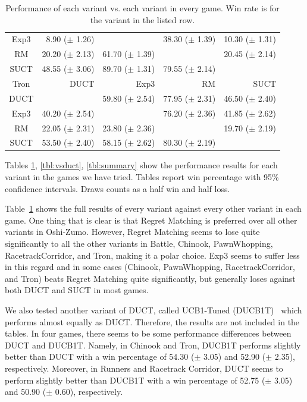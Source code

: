 \documentclass[conference]{IEEEtran}
\begin{document}
\begin{table}
\begin{center}
\begin{tabular}{|c|rrrr|}
           Exp3    & 8.90 ($\pm$ 1.26)   &          & 38.30 ($\pm$ 1.39)   & 10.30 ($\pm$ 1.31)   \\
             RM    & 20.20 ($\pm$ 2.13)   & 61.70 ($\pm$ 1.39)   &          & 20.45 ($\pm$ 2.14)   \\
           SUCT    & 48.55 ($\pm$ 3.06)   & 89.70 ($\pm$ 1.31)   & 79.55 ($\pm$ 2.14)   &          \\
\hline
\hline
           Tron   &       DUCT   &       Exp3   &         RM   &       SUCT   \\
\hline
           DUCT    &          & 59.80 ($\pm$ 2.54)   & 77.95 ($\pm$ 2.31)   & 46.50 ($\pm$ 2.40)   \\
           Exp3    & 40.20 ($\pm$ 2.54)   &          & 76.20 ($\pm$ 2.36)   & 41.85 ($\pm$ 2.62)   \\
             RM    & 22.05 ($\pm$ 2.31)   & 23.80 ($\pm$ 2.36)   &          & 19.70 ($\pm$ 2.19)   \\
           SUCT    & 53.50 ($\pm$ 2.40)   & 58.15 ($\pm$ 2.62)   & 80.30 ($\pm$ 2.19)   &          \\
\hline
\end{tabular}
\end{center}
\caption{Performance of each variant vs. each variant in every game. Win rate is for the variant in the listed row. \label{tbl:cross}}
\end{table}

Tables \ref{tbl:cross}, \ref{tbl:vsduct}, \ref{tbl:summary} show the performance results for each variant in the games we have tried. 
Tables report win percentage with 95\% confidence intervals. Draws counts as a half win and half loss. 

Table~\ref{tbl:cross} shows the full results of every variant against every other variant in each game. One thing that is clear is that 
Regret Matching is preferred over all other variants in Oshi-Zumo. However, Regret Matching seems to lose quite significantly to all the 
other variants in Battle, Chinook, PawnWhopping, RacetrackCorridor, and Tron, making it a polar choice. Exp3 seems to suffer less in this
regard and in some cases (Chinook, PawnWhopping, RacetrackCorridor, and Tron) beats Regret Matching quite significantly, but generally loses
against both DUCT and SUCT in most games. 

We also tested another variant of DUCT, called UCB1-Tuned (DUCB1T)~\cite{Auer02Finite} which performs almost equally as DUCT. Therefore, the results are not included in the tables. In four games, there seems to be some performance differences between DUCT and DUCB1T. Namely, in Chinook and Tron, DUCB1T performs slightly better than DUCT with a win percentage of 54.30 ($\pm$ 3.05) and 52.90 ($\pm$ 2.35), respectively. Moreover, in Runners and Racetrack Corridor, DUCT seems to perform slightly better than DUCB1T with a win percentage of 52.75 ($\pm$ 3.05) and 50.90 ($\pm$ 0.60), respectively.  
\end{document}

